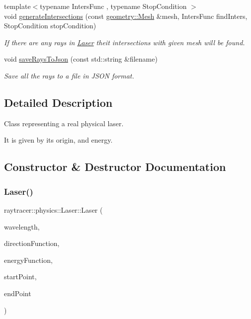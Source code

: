 \begin{DoxyCompactItemize}
{\footnotesize template$<$typename Inters\+Func , typename Stop\+Condition $>$ }\\void \hyperlink{classraytracer_1_1physics_1_1Laser_a6e8478566acd96cb5a752f236cd070f3}{generate\+Intersections} (const \hyperlink{classraytracer_1_1geometry_1_1Mesh}{geometry\+::\+Mesh} \&mesh, Inters\+Func find\+Inters, Stop\+Condition stop\+Condition)
\begin{DoxyCompactList}\small\item\em If there are any rays in \hyperlink{classraytracer_1_1physics_1_1Laser}{Laser} theit intersections with given mesh will be found. \end{DoxyCompactList}\item 
void \hyperlink{classraytracer_1_1physics_1_1Laser_adfb22ae48261bdc37db1f36fca20065f}{save\+Rays\+To\+Json} (const std\+::string \&filename)
\begin{DoxyCompactList}\small\item\em Save all the rays to a file in J\+S\+ON format. \end{DoxyCompactList}\end{DoxyCompactItemize}


\subsection{Detailed Description}
Class representing a real physical laser. 

It is given by its origin, and energy. 

\subsection{Constructor \& Destructor Documentation}
\mbox{\label{classraytracer_1_1physics_1_1Laser_aaac32df0c929962080aa6c6e0acdff17}} 
\subsubsection{\texorpdfstring{Laser()}{Laser()}}
{\footnotesize\ttfamily raytracer\+::physics\+::\+Laser\+::\+Laser (\begin{DoxyParamCaption}\item[{\hyperlink{structraytracer_1_1physics_1_1Length}{Length}}]{wavelength,  }\item[{Direction\+Fun}]{direction\+Function,  }\item[{Energy\+Fun}]{energy\+Function,  }\item[{\hyperlink{classraytracer_1_1geometry_1_1Point}{geometry\+::\+Point}}]{start\+Point,  }\item[{\hyperlink{classraytracer_1_1geometry_1_1Point}{geometry\+::\+Point}}]{end\+Point }\end{DoxyParamCaption})}



